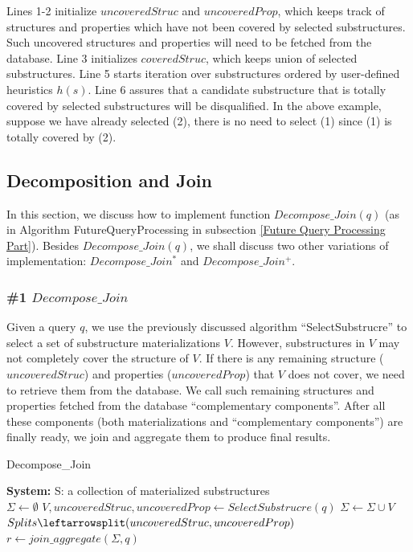 Lines 1-2 initialize $uncoveredStruc$ and $uncoveredProp$, which keeps track of structures and properties which have not been covered by selected substructures. Such uncovered structures and properties will need to be fetched from the database. Line 3 initializes $coveredStruc$, which keeps union of selected substructures. Line 5 starts iteration over substructures ordered by user-defined heuristics $h(s)$. Line 6 assures that a candidate substructure that is totally covered by selected substructures will be disqualified. In the above example, suppose we have already selected (2), there is no need to select (1) since (1) is totally covered by (2).

\subsection{Decomposition and Join}
\label{Query Decomposition}
In this section, we  discuss how to implement function $Decompose\_Join(q)$ (as in Algorithm FutureQueryProcessing in subsection \ref{Future Query Processing Part}). Besides $Decompose\_Join(q)$, we shall discuss two other variations of implementation: $Decompose\_Join^{*}$ and $Decompose\_Join^{+}$.

\subsubsection{\#1 $Decompose\_Join$}
Given a query $q$, we use the previously discussed algorithm ``SelectSubstrucre'' to select a set of substructure materializations $V$. However, substructures in $V$ may not completely cover the structure of $V$. If there is any remaining structure ($uncoveredStruc$) and properties ($uncoveredProp$) that $V$ does not cover, we need to retrieve them from the database. We call such remaining structures and properties fetched from the database ``complementary  components''. After all these components (both materializations and ``complementary  components'') are finally ready, we join and aggregate them to produce final results.

\begin{algorithm}[H]
\caption{Decompose\_Join}
\LinesNumbered
\textbf{System:} S: a collection of materialized substructures\\
$\Sigma \gets \emptyset $\;
$V, uncoveredStruc, uncoveredProp \gets SelectSubstrucre(q) $\;
$\Sigma \gets \Sigma \cup V $\;
$Splits\leftarrowsplit(uncoveredStruc, uncoveredProp)$\;
$r \leftarrow join\_aggregate(\Sigma, q)$\;
\end{algorithm}

